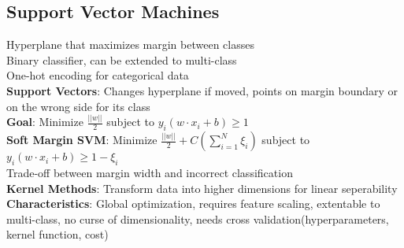 \documentclass{article}
\begin{document}
\begin{multicols*}{2}
        \subsection*{Support Vector Machines}
        Hyperplane that maximizes margin between classes\\
        Binary classifier, can be extended to multi-class\\
        One-hot encoding for categorical data\\
        \textbf{Support Vectors}: Changes hyperplane if moved, points on margin boundary or on
        the wrong side for its class\\
        \textbf{Goal}: Minimize $\frac{\lvert\lvert w \rvert\rvert}{2}$ subject to $y_i(w \cdot
        x_i + b) \geq 1$\\
        \textbf{Soft Margin SVM}: Minimize $\frac{\lvert\lvert w \rvert\rvert}{2} + C(\sum_{i=1}^{N} \xi_i)$
        subject to $y_i(w \cdot x_i + b) \geq 1 - \xi_i$\\
        Trade-off between margin width and incorrect classification\\
        \textbf{Kernel Methods}: Transform data into higher dimensions for linear seperability\\
        \textbf{Characteristics}: Global optimization, requires feature scaling, extentable to
        multi-class, no curse of dimensionality, needs cross validation(hyperparameters, kernel
        function, cost)\\
    \end{multicols*}
\end{document}
